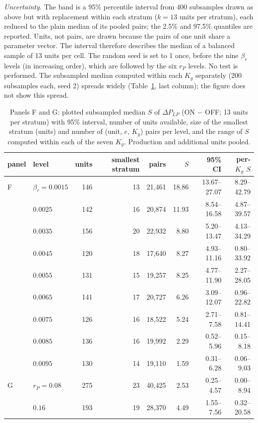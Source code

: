 \documentclass[11pt]{article}
\begin{document}
\emph{Uncertainty.} The band is a 95\% percentile interval from 400 subsamples drawn
as above but with replacement within each stratum ($k = 13$ units per stratum), each
reduced to the plain median of its pooled pairs; the 2.5\% and 97.5\% quantiles are
reported. Units, not pairs, are drawn because the pairs of one unit share a parameter
vector. The interval therefore describes the median of a balanced sample of 13 units
per cell. The random seed is set to 1 once, before the nine $\beta_r$ levels (in
increasing order), which are followed by the six $r_P$ levels. No test is performed.
The subsampled median computed within each $K_g$ separately (200 subsamples each,
seed 2) spreads widely (Table~\ref{tab:fig01-FG}, last column); the figure does not
show this spread.

\begin{table}[H]
\centering
\caption{Panels F and G: plotted subsampled median $S$ of $\Delta P_{LP}$ (ON $-$ OFF;
13 units per stratum) with 95\% interval, number of units available, size of the
smallest stratum (units) and number of (unit, $e$, $K_g$) pairs per level, and the
range of $S$ computed within each of the seven $K_g$. Production and additional units
pooled.}
\label{tab:fig01-FG}
\begin{tabular}{llrrrrrr}
\toprule
panel & level & units & smallest stratum & pairs & $S$ & 95\% CI & per-$K_g$ $S$ \\
\midrule
F & $\beta_r = 0.0015$ & 146 & 13 & 21{,}461 & 18.86 & 13.67--27.07 & 8.29--42.79 \\
  & $0.0025$ & 142 & 16 & 20{,}874 & 11.93 & 8.54--16.58 & 4.87--39.57 \\
  & $0.0035$ & 156 & 20 & 22{,}932 & 8.80 & 5.20--13.47 & 4.13--34.29 \\
  & $0.0045$ & 120 & 18 & 17{,}640 & 8.27 & 4.93--11.16 & 0.80--33.92 \\
  & $0.0055$ & 131 & 15 & 19{,}257 & 8.25 & 4.77--11.90 & 2.27--28.05 \\
  & $0.0065$ & 141 & 17 & 20{,}727 & 6.26 & 3.09--12.07 & 0.96--22.82 \\
  & $0.0075$ & 126 & 16 & 18{,}522 & 5.24 & 2.71--7.58 & 0.81--14.41 \\
  & $0.0085$ & 136 & 16 & 19{,}992 & 2.29 & 0.52--5.96 & 0.15--8.18 \\
  & $0.0095$ & 130 & 14 & 19{,}110 & 1.59 & 0.31--6.28 & 0.06--9.03 \\
G & $r_P = 0.08$ & 275 & 23 & 40{,}425 & 2.53 & 0.25--4.57 & 0.00--8.94 \\
  & $0.16$ & 193 & 19 & 28{,}370 & 4.49 & 1.55--7.56 & 0.32--20.58 \\

\end{tabular}
\end{table}
\end{document}
